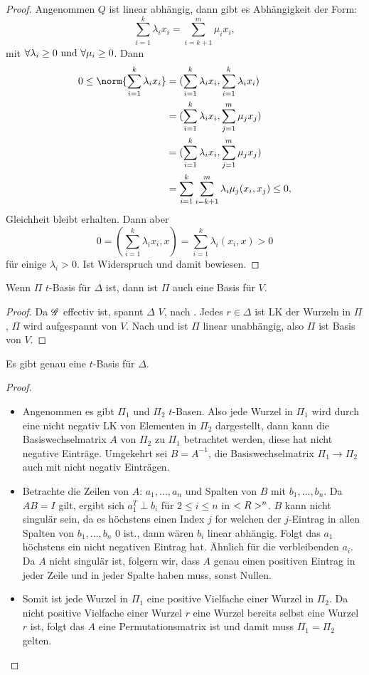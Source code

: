 \begin{proof}
	Angenommen $Q$ ist linear abhängig, dann gibt es Abhängigkeit der Form:
	\[
		\sum_{i=1}^k \lambda_i x_i = \sum_{i=k+1}^m \mu_i x_i,
	\]
	mit $\forall \lambda_i \ge 0 \text{ und } \forall \mu_i \ge 0$. Dann
	\begin{align*}
		0 \le \norm{\sum_{i=1}^k \lambda_i x_i} &= (\sum_{i=1}^k \lambda_i x_i, \sum_{i=1}^k \lambda_i x_i)\\
		&= (\sum_{i=1}^k \lambda_i x_i, \sum_{j=1}^m \mu_j x_j)\\
		&= (\sum_{i=1}^k \lambda_i x_i, \sum_{j=1}^m \mu_j x_j)\\
		&= \sum_{i=1}^k \sum_{i=k+1}^m \lambda_i \mu_j (x_i,x_j) \le 0,
	\end{align*}
	Gleichheit bleibt erhalten. Dann aber
	\[
		0 = (\sum_{i=1}^k \lambda_i x_i,x) = \sum_{i=1}^k \lambda_i (x_i,x) >0
	\]
	für einige $\lambda_i > 0$. Ist Widerspruch und damit bewiesen.
\end{proof}
\begin{theorem}
	Wenn $\Pi$ $t$-Basis für $\Delta$ ist, dann ist $\Pi$ auch eine Basis für $V$.
\end{theorem}
\begin{proof}
	Da $\mathscr G$ effectiv ist, spannt $\Delta$ $V$, nach . Jedes $r \in \Delta$ ist LK der Wurzeln in $\Pi$, $\Pi$ wird aufgespannt von $V$. Nach  und  ist $\Pi$ linear unabhängig, also $\Pi$ ist Basis von $V$.
\end{proof}
\begin{proposition}
	Es gibt genau eine $t$-Basis für $\Delta$.
\end{proposition}
\begin{proof}
	\begin{itemize}
		\item Angenommen es gibt $\Pi_1$ und $\Pi_2$ $t$-Basen. Also jede Wurzel in $\Pi_1$ wird durch eine nicht negativ LK von Elementen in $\Pi_2$ dargestellt, dann kann die Basiswechselmatrix $A$ von $\Pi_2$ zu $\Pi_1$ betrachtet werden, diese hat nicht negative Einträge. Umgekehrt sei $B = A^{-1}$, die Basiswechselmatrix $\Pi_1 \to \Pi_2$ auch mit nicht negativ Einträgen.
		\item Betrachte die Zeilen von $A$: $a_1, \dots, a_n$ und Spalten von $B$ mit $b_1, \dots, b_n$. Da $AB = I$ gilt, ergibt sich $a_1^T \perp b_i$ für $2 \le i \le n$ in $<R>^n$. $B$ kann nicht singulär sein, da es höchstens einen Index $j$ for welchen der $j$-Eintrag in allen Spalten von $b_1, \dots, b_n$ 0 ist., dann wären $b_i$ linear abhängig. Folgt das $a_1$ höchstens ein nicht negativen Eintrag hat. Ähnlich für die verbleibenden $a_i$. Da $A$ nicht singulär ist, folgern wir, dass $A$ genau einen positiven Eintrag in jeder Zeile und in jeder Spalte haben muss, sonst Nullen.
		\item Somit ist jede Wurzel in $\Pi_1$ eine positive Vielfache einer Wurzel in $\Pi_2$. Da nicht positive Vielfache einer Wurzel $r$ eine Wurzel bereits selbst eine Wurzel $r$ ist, folgt das $A$ eine Permutationsmatrix ist und damit muss $\Pi_1 = \Pi_2$ gelten. 
	\end{itemize}
	
\end{proof}
